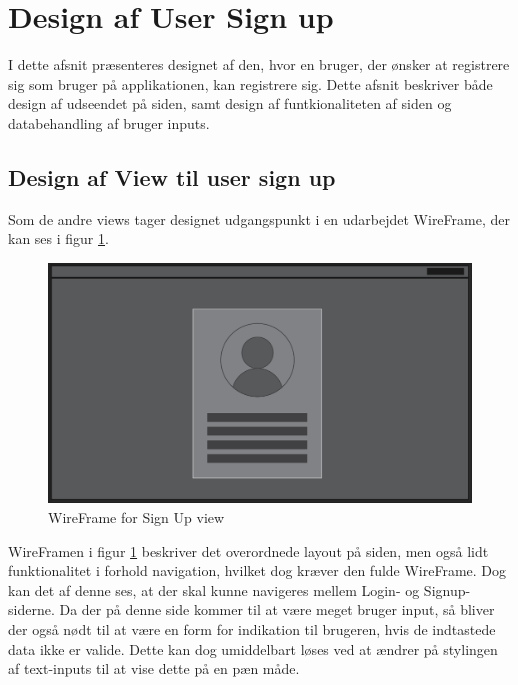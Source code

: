 \documentclass[SoftwareDesign/SoftwareDesign_main.tex]{subfiles}
\begin{document}
\section{Design af User Sign up}
I dette afsnit præsenteres designet af den, hvor en bruger, der ønsker at registrere sig som bruger på applikationen, kan registrere sig. Dette afsnit beskriver både design af udseendet på siden, samt design af funtkionaliteten af siden og databehandling af bruger inputs.
\subsection{Design af View til user sign up}
Som de andre views tager designet udgangspunkt i en udarbejdet WireFrame, der kan ses i figur \ref{fig:signup_wf}.
\begin{figure}[H]
    \centering
    \includegraphics[width=\textwidth]{SoftwareDesign/MVVMDesigns/Graphics/SignupWireFrame.png}
    \caption{WireFrame for Sign Up view}
    \label{fig:signup_wf}
\end{figure}
WireFramen i figur \ref{fig:signup_wf} beskriver det overordnede layout på siden, men også lidt funktionalitet i forhold navigation, hvilket dog kræver den fulde WireFrame. Dog kan det af denne ses, at der skal kunne navigeres mellem Login- og Signup-siderne. Da der på denne side kommer til at være meget bruger input, så bliver der også nødt til at være en form for indikation til brugeren, hvis de indtastede data ikke er valide. Dette kan dog umiddelbart løses ved at ændrer på stylingen af text-inputs til at vise dette på en pæn måde.
\end{document}
